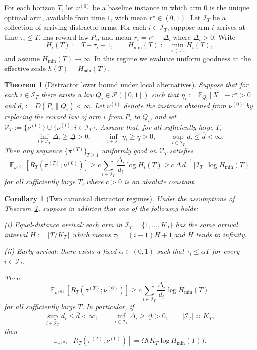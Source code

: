 \documentclass[11pt]{article}
\newtheorem{theorem}{Theorem}
\newtheorem{corollary}{Corollary}
\begin{document}
For each horizon $T$, let $\nu^{(0)}$ be a baseline instance in which arm $0$ is the unique
optimal arm, available from time $1$, with mean $r^\star\in(0,1)$. Let $\mathcal I_T$ be a
collection of arriving distractor arms. For each $i\in\mathcal I_T$, suppose arm $i$ arrives at
time $\tau_i\le T$, has reward law $P_i$, and mean
\(
r_i=r^\star-\Delta_i
\) where \(
\Delta_i>0.
\)
Write
\[
H_i(T):=T-\tau_i+1,
\qquad
H_{\min}(T):=\min_{i\in\mathcal I_T}H_i(T),
\]
and assume $H_{\min}(T)\to\infty$. In this regime we evaluate uniform goodness at the effective
scale $h(T)=H_{\min}(T)$.

\begin{theorem}[Distractor lower bound under local alternatives]
\label{thm:distractor-lb-local}
Suppose that for each $i\in\mathcal I_T$ there exists a law $Q_i\in\mathcal P([0,1])$ such that
\(
\eta_i:=\mathbb E_{Q_i}[X]-r^\star>0 \) and
\(
d_i:=D(P_i\|Q_i)<\infty.
\)
Let $\nu^{(i)}$ denote the instance obtained from $\nu^{(0)}$ by replacing the reward law
of arm $i$ from $P_i$ to $Q_i$, and set
\(
\mathcal V_T:=\{\nu^{(0)}\}\cup\{\nu^{(i)}:i\in\mathcal I_T\}.
\)
Assume that, for all sufficiently large $T$,
\[
\inf_{i\in\mathcal I_T}\Delta_i\ge \underline\Delta>0,
\qquad
\inf_{i\in\mathcal I_T}\eta_i\ge \underline\eta>0,
\qquad
\sup_{i\in\mathcal I_T}d_i\le \overline d<\infty.
\]
Then any sequence $\{\pi^{(T)}\}_{T\ge1}$ uniformly good on $\mathcal V_T$ satisfies
\[
\mathbb E_{\nu^{(0)}}[R_T(\pi^{(T)};\nu^{(0)})]
\ge
c\sum_{i\in\mathcal I_T}\frac{\Delta_i}{d_i}\log H_i(T)
\ge
c\,\underline\Delta\,\overline d^{-1}\,|\mathcal I_T|\,\log H_{\min}(T)
\]
for all sufficiently large $T$, where $c>0$ is an absolute constant.
\end{theorem}

\begin{corollary}[Two canonical distractor regimes]
\label{cor:distractor-lb-regimes}
Under the assumptions of Theorem~\ref{thm:distractor-lb-local}, suppose in addition that one
of the following holds:

\smallskip
\noindent
\textup{(i) Equal-distance arrival: } each arm in $\mathcal I_T=\{1,\dots,K_T\}$ has the same arrival interval $H:=\lfloor T/K_T\rfloor$ which means $\tau_i=(i-1)H+1$,and $H$ tends to infinity.

\smallskip
\noindent
\textup{(ii) Early arrival: } there exists a fixed $\alpha\in(0,1)$ such that
\(
\tau_i\le \alpha T\)
for every \(i\in\mathcal I_T.
\)

Then
\[
\mathbb E_{\nu^{(0)}}[R_T(\pi^{(T)};\nu^{(0)})]
\ge
c\sum_{i\in\mathcal I_T}\frac{\Delta_i}{d_i}\log H_{\min}(T)
\]
for all sufficiently large $T$. In particular, if
\[
\sup_{i\in\mathcal I_T} d_i\le \overline d<\infty,
\qquad
\inf_{i\in\mathcal I_T}\Delta_i\ge \underline\Delta>0,
\qquad
|\mathcal I_T|\asymp K_T,
\]
then
\[
\mathbb E_{\nu^{(0)}}[R_T(\pi^{(T)};\nu^{(0)})]
=
\Omega\bigl(K_T\log H_{\min}(T)\bigr).
\]
\end{corollary}
\end{document}
